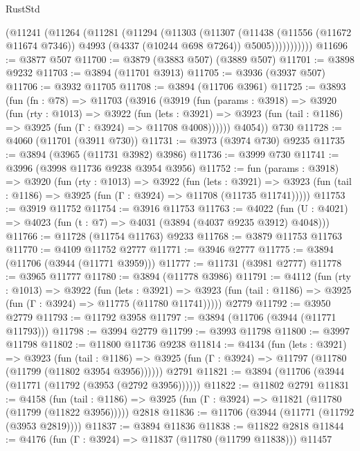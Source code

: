 \begin{lexlean}{RustStd}
\begin{coremodule}
            (@11241
              (@11264
                (@11281
                  (@11294
                    (@11303
                      (@11307
                        (@11438
                          (@11556 (@11672 @11674 @7346))
                          @4993
                          (@4337 (@10244 @698 @7264))
                          @5005)))))))))))
@11696 := @3877 @507
@11700 := @3879 (@3883 @507) (@3889 @507)
@11701 := @3898 @9232
@11703 := @3894 (@11701 @3913)
@11705 := @3936 (@3937 @507)
@11706 := @3932 @11705
@11708 := @3894 (@11706 @3961)
@11725 := @3893
    (fun (fn : @78) =>
    @11703
      (@3916
        (@3919
          (fun (params : @3918) =>
          @3920
            (fun (rty : @1013) =>
            @3922
              (fun (lets : @3921) =>
              @3923 (fun (tail : @1186) => @3925 (fun (Γ : @3924) => @11708 @4008))))))
        @4054))
    @730
@11728 := @4060 (@11701 (@3911 @730))
@11731 := @3973 (@3974 @730) @9235
@11735 := @3894 (@3965 (@11731 @3982) @3986)
@11736 := @3999 @730
@11741 := @3996 (@3998 @11736 @9238 @3954 @3956)
@11752 := fun (params : @3918) =>
  @3920
    (fun (rty : @1013) =>
    @3922
      (fun (lets : @3921) =>
      @3923 (fun (tail : @1186) => @3925 (fun (Γ : @3924) => @11708 (@11735 @11741)))))
@11753 := @3919 @11752
@11754 := @3916 @11753
@11763 := @4022 (fun (U : @4021) => @4023 (fun (t : @7) => @4031 (@3894 (@4037 @9235 @3912) @4048)))
@11766 := @11728 (@11754 @11763) @9233
@11768 := @3879 @11753 @11763
@11770 := @4109 @11752 @2777
@11771 := @3946 @2777
@11775 := @3894 (@11706 (@3944 (@11771 @3959)))
@11777 := @11731 (@3981 @2777)
@11778 := @3965 @11777
@11780 := @3894 (@11778 @3986)
@11791 := @4112
    (fun (rty : @1013) =>
    @3922
      (fun (lets : @3921) =>
      @3923 (fun (tail : @1186) => @3925 (fun (Γ : @3924) => @11775 (@11780 @11741)))))
    @2779
@11792 := @3950 @2779
@11793 := @11792 @3958
@11797 := @3894 (@11706 (@3944 (@11771 @11793)))
@11798 := @3994 @2779
@11799 := @3993 @11798
@11800 := @3997 @11798
@11802 := @11800 @11736 @9238
@11814 := @4134
    (fun (lets : @3921) =>
    @3923
      (fun (tail : @1186) =>
      @3925 (fun (Γ : @3924) => @11797 (@11780 (@11799 (@11802 @3954 @3956))))))
    @2791
@11821 := @3894 (@11706 (@3944 (@11771 (@11792 (@3953 (@2792 @3956))))))
@11822 := @11802 @2791
@11831 := @4158
    (fun (tail : @1186) => @3925 (fun (Γ : @3924) => @11821 (@11780 (@11799 (@11822 @3956)))))
    @2818
@11836 := @11706 (@3944 (@11771 (@11792 (@3953 @2819))))
@11837 := @3894 @11836
@11838 := @11822 @2818
@11844 := @4176 (fun (Γ : @3924) => @11837 (@11780 (@11799 @11838))) @11457

\end{coremodule}
\end{lexlean}
